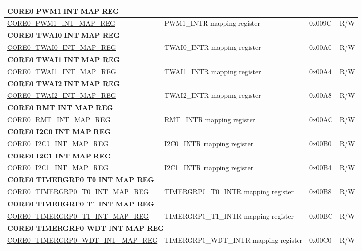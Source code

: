 \begin{longtable}{ | p{7.5cm} | p{7.2cm} | p{1.3cm} | p{1cm} | }
\multicolumn{4}{|l|}{\textbf{CORE0 PWM1 INT MAP REG}} \\ \hline
\hyperref[regdesc:CORE0PWM1INTMAPREG]{CORE0\_PWM1\_INT\_MAP\_REG} & PWM1\_INTR mapping register & 0x009C & R/W \\ \hline
\multicolumn{4}{|l|}{\textbf{CORE0 TWAI0 INT MAP REG}} \\ \hline
\hyperref[regdesc:CORE0TWAI0INTMAPREG]{CORE0\_TWAI0\_INT\_MAP\_REG} & TWAI0\_INTR mapping register & 0x00A0 & R/W \\ \hline
\multicolumn{4}{|l|}{\textbf{CORE0 TWAI1 INT MAP REG}} \\ \hline
\hyperref[regdesc:CORE0TWAI1INTMAPREG]{CORE0\_TWAI1\_INT\_MAP\_REG} & TWAI1\_INTR mapping register & 0x00A4 & R/W \\ \hline
\multicolumn{4}{|l|}{\textbf{CORE0 TWAI2 INT MAP REG}} \\ \hline
\hyperref[regdesc:CORE0TWAI2INTMAPREG]{CORE0\_TWAI2\_INT\_MAP\_REG} & TWAI2\_INTR mapping register & 0x00A8 & R/W \\ \hline
\multicolumn{4}{|l|}{\textbf{CORE0 RMT INT MAP REG}} \\ \hline
\hyperref[regdesc:CORE0RMTINTMAPREG]{CORE0\_RMT\_INT\_MAP\_REG} & RMT\_INTR mapping register & 0x00AC & R/W \\ \hline
\multicolumn{4}{|l|}{\textbf{CORE0 I2C0 INT MAP REG}} \\ \hline
\hyperref[regdesc:CORE0I2C0INTMAPREG]{CORE0\_I2C0\_INT\_MAP\_REG} & I2C0\_INTR mapping register & 0x00B0 & R/W \\ \hline
\multicolumn{4}{|l|}{\textbf{CORE0 I2C1 INT MAP REG}} \\ \hline
\hyperref[regdesc:CORE0I2C1INTMAPREG]{CORE0\_I2C1\_INT\_MAP\_REG} & I2C1\_INTR mapping register & 0x00B4 & R/W \\ \hline
\multicolumn{4}{|l|}{\textbf{CORE0 TIMERGRP0 T0 INT MAP REG}} \\ \hline
\hyperref[regdesc:CORE0TIMERGRP0T0INTMAPREG]{CORE0\_TIMERGRP0\_T0\_INT\_MAP\_REG} & TIMERGRP0\_T0\_INTR mapping register & 0x00B8 & R/W \\ \hline
\multicolumn{4}{|l|}{\textbf{CORE0 TIMERGRP0 T1 INT MAP REG}} \\ \hline
\hyperref[regdesc:CORE0TIMERGRP0T1INTMAPREG]{CORE0\_TIMERGRP0\_T1\_INT\_MAP\_REG} & TIMERGRP0\_T1\_INTR mapping register & 0x00BC & R/W \\ \hline
\multicolumn{4}{|l|}{\textbf{CORE0 TIMERGRP0 WDT INT MAP REG}} \\ \hline
\hyperref[regdesc:CORE0TIMERGRP0WDTINTMAPREG]{CORE0\_TIMERGRP0\_WDT\_INT\_MAP\_REG} & TIMERGRP0\_WDT\_INTR mapping register & 0x00C0 & R/W \\ \hline

\end{longtable}
